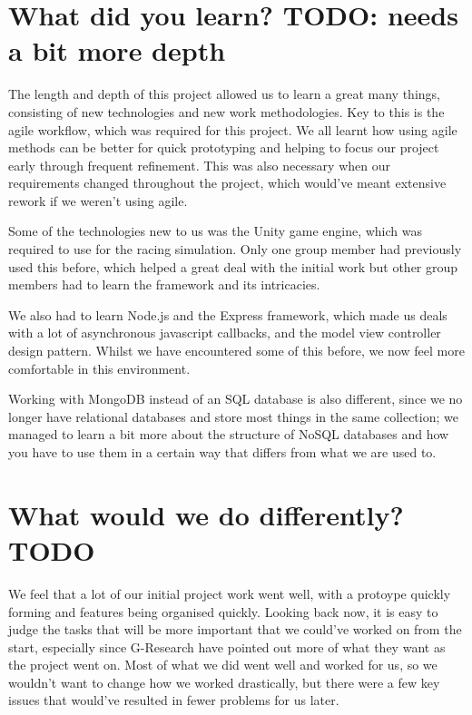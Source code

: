 \section{What did you learn? TODO: needs a bit more depth}

The length and depth of this project allowed us to learn a great many things,
consisting of new technologies and new work methodologies. Key to this is the
agile workflow, which was required for this project. We all learnt how using
agile methods can be better for quick prototyping and helping to focus our
project early through frequent refinement. This was also necessary when our
requirements changed throughout the project, which would've meant extensive
rework if we weren't using agile.

Some of the technologies new to us was the Unity game engine, which was required
to use for the racing simulation. Only one group member had previously used this
before, which helped a great deal with the initial work but other group members
had to learn the framework and its intricacies. 

We also had to learn Node.js and the Express framework, which made us deals with
a lot of asynchronous javascript callbacks, and the model view controller design
pattern. Whilst we have encountered some of this before, we now feel more
comfortable in this environment.

Working with MongoDB instead of an SQL database is also different, since we no
longer have relational databases and store most things in the same collection;
we managed to learn a bit more about the structure of NoSQL databases and how you
have to use them in a certain way that differs from what we are used to.

\section{What would we do differently? TODO}

We feel that a lot of our initial project work went well, with a protoype
quickly forming and features being organised quickly. Looking back now, it is
easy to judge the tasks that will be more important that we could've worked on
from the start, especially since G-Research have pointed out more of what they
want as the project went on. Most of what we did went well and worked for us, so
we wouldn't want to change how we worked drastically, but there were a few key
issues that would've resulted in fewer problems for us later.

